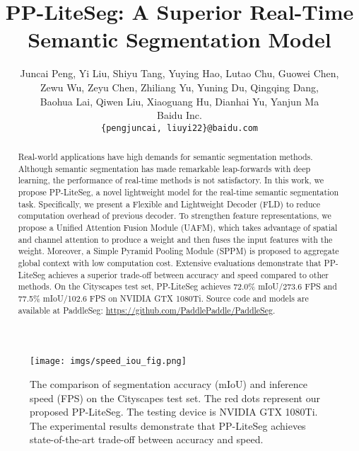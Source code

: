 \documentclass[10pt,twocolumn,letterpaper]{article}
\begin{document}
\title{PP-LiteSeg: A Superior Real-Time Semantic Segmentation Model}

\author{Juncai Peng, Yi Liu, Shiyu Tang, Yuying Hao, Lutao Chu,  Guowei Chen,\\ Zewu Wu, Zeyu Chen, Zhiliang Yu, Yuning Du, Qingqing Dang, \\ Baohua Lai, Qiwen Liu, Xiaoguang Hu, Dianhai Yu, Yanjun Ma\\
        Baidu Inc.\\
{\tt\small \{pengjuncai, liuyi22\}@baidu.com}
}
\maketitle







\begin{abstract}
Real-world applications have high demands for semantic segmentation methods.
Although semantic segmentation has made remarkable leap-forwards with deep learning, the performance of real-time methods is not satisfactory.
In this work, we propose PP-LiteSeg, a novel lightweight model for the real-time semantic segmentation task.
Specifically, we present a Flexible and Lightweight Decoder (FLD) to reduce computation overhead of previous decoder.
To strengthen feature representations, we propose a Unified Attention Fusion Module (UAFM), which takes advantage of spatial and channel attention to produce a weight and then fuses the input features with the weight.
Moreover, a Simple Pyramid Pooling Module (SPPM) is proposed to aggregate global context with low computation cost.
Extensive evaluations demonstrate that PP-LiteSeg achieves a superior trade-off between accuracy and speed compared to other methods.
On the Cityscapes test set, PP-LiteSeg achieves 72.0\% mIoU/273.6 FPS and 77.5\% mIoU/102.6 FPS on NVIDIA GTX 1080Ti.
Source code and models are available at PaddleSeg: \href{https://github.com/PaddlePaddle/PaddleSeg}{https://github.com/PaddlePaddle/PaddleSeg}.


\end{abstract}

\begin{figure}[t]
    \centering
    \texttt{[image: imgs/speed\_iou\_fig.png]}
    \caption{The comparison of segmentation accuracy (mIoU) and inference speed (FPS) on the Cityscapes test set. The red dots represent our proposed PP-LiteSeg. The testing device is NVIDIA GTX 1080Ti. The experimental results demonstrate that PP-LiteSeg achieves state-of-the-art trade-off between accuracy and speed. }
    \label{fig:speed_iou_fig}
\end{figure}
\end{document}
